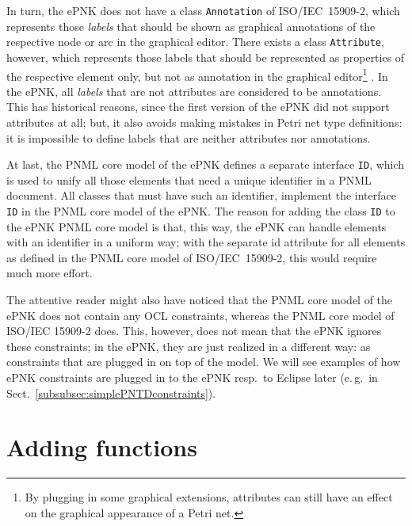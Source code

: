 In turn, the ePNK does not have a class {\tt Annotation}%
of ISO/IEC~15909-2, which represents those \emph{labels}%
that should be shown as graphical annotations
of the respective node or arc in the graphical editor. There exists a
class {\tt Attribute},%
however, which represents those labels that
should be represented as properties of the respective element only,
but not as annotation in the graphical editor\footnote
 {By plugging in some graphical extensions, attributes can still have an effect
  on the graphical appearance of a Petri net.}%
. In the ePNK, all \emph{labels}%
that are not attributes are considered to be
annotations. This has historical reasons, since the first version of the
ePNK did not support attributes at all; but, it also avoids making mistakes
in Petri net type definitions: it is impossible to define labels
that are neither attributes nor annotations.

At last, the PNML core model of the ePNK defines a separate interface {\tt ID},%
which is used to unify all those elements that need a unique identifier in a
PNML document. All classes that must have such an identifier, implement the
interface {\tt ID} in the PNML core model of the ePNK. The reason for adding
the class {\tt ID} to the ePNK PNML core model is that, this way, the ePNK can
handle elements with an identifier in a uniform way; with the separate
id attribute for all elements as defined in the PNML core model of
ISO/IEC~15909-2, this would require much more effort.%
  
The attentive reader might also have noticed that the PNML core model of the
ePNK does not contain any OCL constraints, whereas the PNML core model
of ISO/IEC 15909-2 does. This, however, does not mean that the ePNK ignores
these constraints; in the ePNK, they are just realized in a different way:
as constraints that are plugged in on top of the model. We will see examples of
how ePNK constraints are plugged in to the ePNK resp.\ to Eclipse later
(e.\,g.\ in Sect.~\ref{subsubsec:simplePNTDconstraints}).

\section{Adding functions}  
\label{sec:adding-functions}

